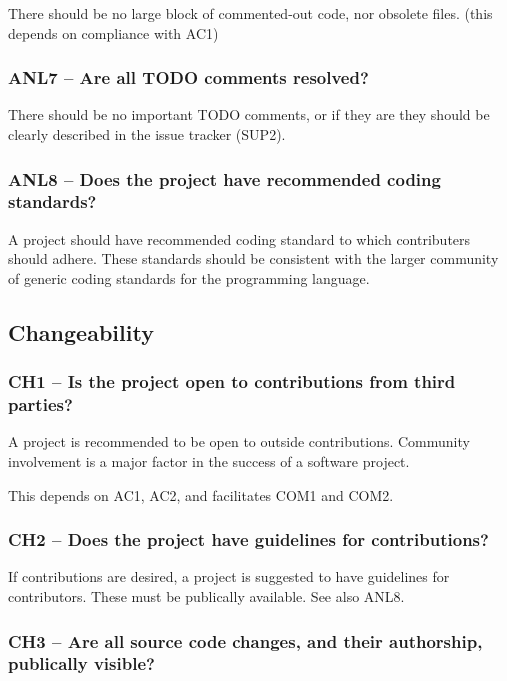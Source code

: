 \documentclass[a4paper,11pt]{article}
\begin{document}
There should be no large block of commented-out code, nor obsolete files.
(this depends on compliance with AC1)

\subsubsection{ANL7 -- Are all TODO comments resolved?}

There should be no important TODO comments, or if they are they should be
clearly described in the issue tracker (SUP2).

\subsubsection{ANL8 -- Does the project have recommended coding standards?}

A project should have recommended coding standard to which contributers
should adhere. These standards should be consistent with the larger community
of generic coding standards for the programming language.

\subsection{Changeability}

\subsubsection{CH1 -- Is the project open to contributions from third parties?}

A project is recommended to be open to outside contributions. Community
involvement is a major factor in the success of a software project. 

This depends on AC1, AC2, and facilitates COM1 and COM2. 

\subsubsection{CH2 -- Does the project have guidelines for contributions?}

If contributions are desired, a project is suggested to have guidelines for
contributors. These must be publically available.
See also ANL8.

\subsubsection{CH3 -- Are all source code changes, and their authorship, publically visible?} 
\end{document}
